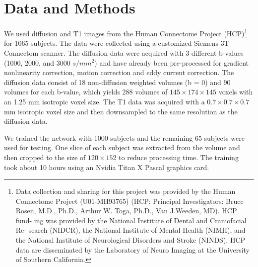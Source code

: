 \documentclass{article}
\begin{document}
\section{Data and Methods}
\label{sec:pagestyle}

We used diffusion and T1 images from the Human Connectome Project (HCP)\footnote{Data collection and sharing for this project was provided by the Human Connectome Project (U01-MH93765) (HCP; Principal Investigators: Bruce Rosen, M.D., Ph.D., Arthur W. Toga, Ph.D., Van J.Weeden, MD). HCP fund- ing was provided by the National Institute of Dental and Craniofacial Re- search (NIDCR), the National Institute of Mental Health (NIMH), and the National Institute of Neurological Disorders and Stroke (NINDS). HCP data are disseminated by the Laboratory of Neuro Imaging at the University of Southern California.} \cite{van2013wu,glasser2013minimal}  for 1065 subjects. The data were collected using a customized Siemens 3T Connectom scanner. The diffusion data were acquired with 3 different b-values (1000, 2000, and 3000 $s/mm^2$) and have already been pre-processed for gradient nonlinearity correction, motion correction and eddy current correction. The diffusion data consist of 18 non-diffusion weighted volumes (b = 0) and 90 volumes for each b-value, which yields 288 volumes of $145 \times 174 \times 145$ voxels with an 1.25 mm isotropic voxel size. The T1 data was acquired with a $0.7 \times 0.7 \times 0.7$ mm isotropic voxel size and then downsampled to the same resolution as the diffusion data.

We trained the network with 1000 subjects and the remaining 65 subjects were used for testing. One slice of each subject was extracted from the volume and then cropped to the size of $120 \times 152$ to reduce processing time. The training took about 10 hours using an Nvidia Titan X Pascal graphics card.
\end{document}
